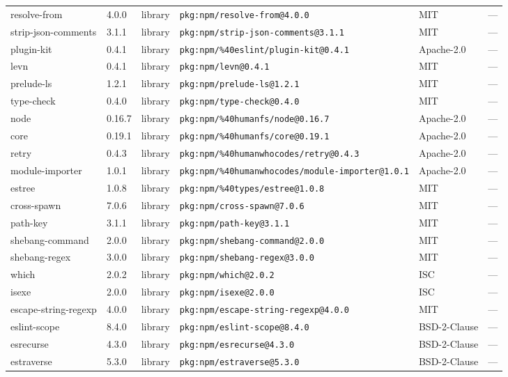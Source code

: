 \documentclass[11pt]{article}
\begin{document}
\begin{longtable}{|l|l|l|p{2.2cm}|l|p{4cm}|}
resolve-from & 4.0.0 & library & \texttt{pkg:npm/resolve-from@4.0.0} & MIT & — \\
strip-json-comments & 3.1.1 & library & \texttt{pkg:npm/strip-json-comments@3.1.1} & MIT & — \\
plugin-kit & 0.4.1 & library & \texttt{pkg:npm/\%40eslint/plugin-kit@0.4.1} & Apache-2.0 & — \\
levn & 0.4.1 & library & \texttt{pkg:npm/levn@0.4.1} & MIT & — \\
prelude-ls & 1.2.1 & library & \texttt{pkg:npm/prelude-ls@1.2.1} & MIT & — \\
type-check & 0.4.0 & library & \texttt{pkg:npm/type-check@0.4.0} & MIT & — \\
node & 0.16.7 & library & \texttt{pkg:npm/\%40humanfs/node@0.16.7} & Apache-2.0 & — \\
core & 0.19.1 & library & \texttt{pkg:npm/\%40humanfs/core@0.19.1} & Apache-2.0 & — \\
retry & 0.4.3 & library & \texttt{pkg:npm/\%40humanwhocodes/retry@0.4.3} & Apache-2.0 & — \\
module-importer & 1.0.1 & library & \texttt{pkg:npm/\%40humanwhocodes/module-importer@1.0.1} & Apache-2.0 & — \\
estree & 1.0.8 & library & \texttt{pkg:npm/\%40types/estree@1.0.8} & MIT & — \\
cross-spawn & 7.0.6 & library & \texttt{pkg:npm/cross-spawn@7.0.6} & MIT & — \\
path-key & 3.1.1 & library & \texttt{pkg:npm/path-key@3.1.1} & MIT & — \\
shebang-command & 2.0.0 & library & \texttt{pkg:npm/shebang-command@2.0.0} & MIT & — \\
shebang-regex & 3.0.0 & library & \texttt{pkg:npm/shebang-regex@3.0.0} & MIT & — \\
which & 2.0.2 & library & \texttt{pkg:npm/which@2.0.2} & ISC & — \\
isexe & 2.0.0 & library & \texttt{pkg:npm/isexe@2.0.0} & ISC & — \\
escape-string-regexp & 4.0.0 & library & \texttt{pkg:npm/escape-string-regexp@4.0.0} & MIT & — \\
eslint-scope & 8.4.0 & library & \texttt{pkg:npm/eslint-scope@8.4.0} & BSD-2-Clause & — \\
esrecurse & 4.3.0 & library & \texttt{pkg:npm/esrecurse@4.3.0} & BSD-2-Clause & — \\
estraverse & 5.3.0 & library & \texttt{pkg:npm/estraverse@5.3.0} & BSD-2-Clause & — \\

\end{longtable}
\end{document}
